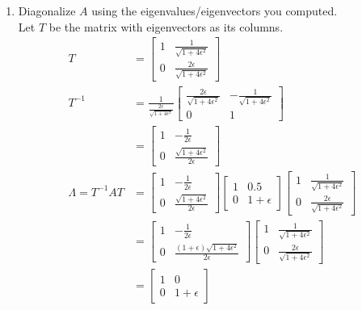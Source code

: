 \documentclass[letter, 11pt]{article}
\begin{document}
\begin{enumerate}[wide = 0pt, label = \textbf{Problem \arabic*:}]
\begin{enumerate}
			\item {Diagonalize $ A $ using the eigenvalues/eigenvectors you computed.} \\
			Let $ T $ be the matrix with eigenvectors as its columns.
			\begin{align*}
				T &= 
				\begin{bmatrix}
				1 & \frac{1}{\sqrt{1 + 4 \epsilon^2}} \\
				0 & \frac{2 \epsilon}{\sqrt{1 + 4 \epsilon^2}}
				\end{bmatrix}
				\\
				T^{-1} &= \frac{1}{\frac{2 \epsilon}{\sqrt{1 + 4 \epsilon^2}}} 
				\begin{bmatrix}
				\frac{2 \epsilon}{\sqrt{1 + 4 \epsilon^2}} & -\frac{1}{\sqrt{1 + 4 \epsilon^2}} \\
				0 & 1
				\end{bmatrix}
				\\
				&=
				\begin{bmatrix}
				1 & -\frac{1}{2 \epsilon} \\
				0 & \frac{\sqrt{1 + 4 \epsilon^2}}{2 \epsilon}
				\end{bmatrix}
				\\
				\Lambda = T^{-1}AT &= 
				\begin{bmatrix}
				1 & -\frac{1}{2 \epsilon} \\
				0 & \frac{\sqrt{1 + 4 \epsilon^2}}{2 \epsilon}
				\end{bmatrix}
				\begin{bmatrix}
				1 & 0.5 \\
				0 & 1 + \epsilon
				\end{bmatrix}
				\begin{bmatrix}
				1 & \frac{1}{\sqrt{1 + 4 \epsilon^2}} \\
				0 & \frac{2 \epsilon}{\sqrt{1 + 4 \epsilon^2}}
				\end{bmatrix}
				\\
				&=
				\begin{bmatrix}
				1 & -\frac{1}{2 \epsilon}\\
				0 & \frac{(1 + \epsilon)\sqrt{1 + 4 \epsilon^2}}{2 \epsilon}
				\end{bmatrix}
				\begin{bmatrix}
				1 & \frac{1}{\sqrt{1 + 4 \epsilon^2}} \\
				0 & \frac{2 \epsilon}{\sqrt{1 + 4 \epsilon^2}}
				\end{bmatrix}
				\\
				&=
				\begin{bmatrix}
				1 & 0 \\
				0 & 1 + \epsilon
				\end{bmatrix}
			\end{align*} \\
			

\end{enumerate}
\end{enumerate}
\end{document}
